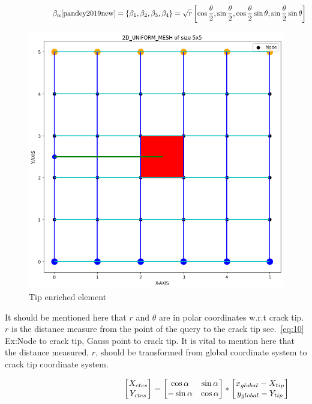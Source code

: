 \documentclass[fleqn, 12.5pt,a4paper]{report}
\begin{document}
\begin{align}\label{eq:8}
\hspace{2.25cm}\beta_{\alpha}\cite{pandey2019new} = \left\{\beta_1, \beta_2, \beta_3, \beta_4 \right\} = \sqrt r \left[\cos\frac{\theta}{2}, \sin\frac{\theta}{2}, \cos\frac{\theta}{2} \sin{\theta}, \sin\frac{\theta}{2} \sin\theta \right]
\end{align}

\begin{figure}[h]
    \centering
    \includegraphics[scale =0.30]{Tip_enr.png}
    \caption{Tip enriched element}
    \label{fig:7}
\end{figure}

It should be mentioned here that $r$ and $\theta$ are in polar coordinates w.r.t crack tip.
$r$ is the distance measure from the point of the query to the crack tip see.~\autoref{eq:10} Ex:\space Node to crack tip, Gauss point to crack tip. It is vital to mention here that the distance measured, $r$, should be transformed from global coordinate system to crack tip coordinate system.

\begin{align}\label{eq:9}
\hspace{4.25cm}\begin{bmatrix} X_{ctcs} \\ Y_{ctcs}  \end{bmatrix}
=
\begin{bmatrix}
\cos\alpha & \sin\alpha\\
-\sin\alpha & \cos\alpha\\
\end{bmatrix}
*
\begin{bmatrix}
x_{global} - X_{tip}\\
y_{global} - Y_{tip}\\
\end{bmatrix}
\end{align}
\end{document}
